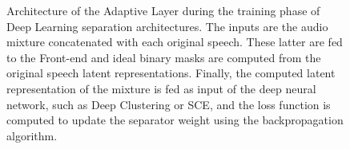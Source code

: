 \documentclass[master, tikz, final,11pt, dvipdfmx]{iscs-thesis}
\begin{document}
\begin{figure}[h]
{
}
\caption[Architecture of the Adaptive Layer during the training phase of Deep Learning separation architectures]{Architecture of the Adaptive Layer during the training phase of Deep Learning separation architectures. The inputs are the audio mixture concatenated with each original speech. These latter are fed to the Front-end and ideal binary masks are computed from the original speech latent representations. Finally, the computed latent representation of the mixture is fed as input of the deep neural network, such as Deep Clustering or SCE, and the loss function is computed to update the separator weight using the backpropagation algorithm. }
\label{fig:adapttrain}
\end{figure}
\end{document}
